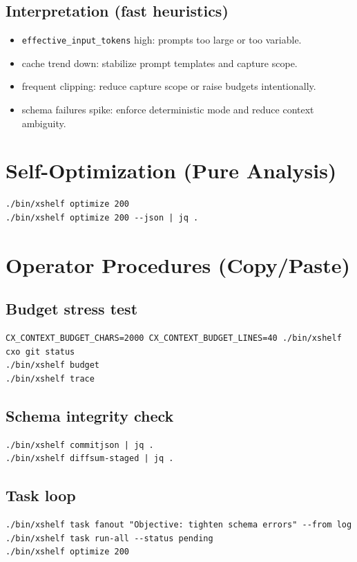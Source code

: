 \documentclass[11pt]{article}
\begin{document}
\subsection{Interpretation (fast heuristics)}
\begin{itemize}
  \item \texttt{effective\_input\_tokens} high: prompts too large or too variable.
  \item cache trend down: stabilize prompt templates and capture scope.
  \item frequent clipping: reduce capture scope or raise budgets intentionally.
  \item schema failures spike: enforce deterministic mode and reduce context ambiguity.
\end{itemize}

\section{Self-Optimization (Pure Analysis)}
\begin{lstlisting}[style=cx]
./bin/xshelf optimize 200
./bin/xshelf optimize 200 --json | jq .
\end{lstlisting}

\section{Operator Procedures (Copy/Paste)}
\subsection*{Budget stress test}
\begin{lstlisting}[style=cx]
CX_CONTEXT_BUDGET_CHARS=2000 CX_CONTEXT_BUDGET_LINES=40 ./bin/xshelf cxo git status
./bin/xshelf budget
./bin/xshelf trace
\end{lstlisting}

\subsection*{Schema integrity check}
\begin{lstlisting}[style=cx]
./bin/xshelf commitjson | jq .
./bin/xshelf diffsum-staged | jq .
\end{lstlisting}

\subsection*{Task loop}
\begin{lstlisting}[style=cx]
./bin/xshelf task fanout "Objective: tighten schema errors" --from log
./bin/xshelf task run-all --status pending
./bin/xshelf optimize 200
\end{lstlisting}
\end{document}
